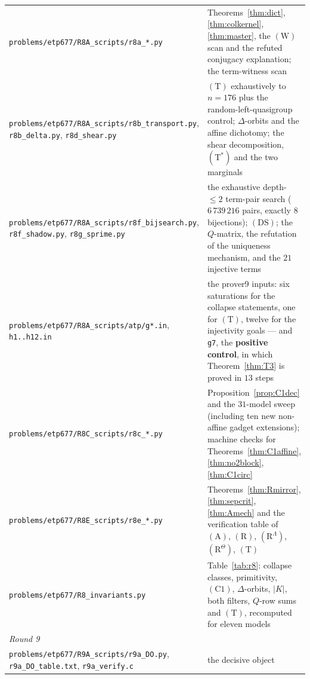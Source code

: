 \documentclass[11pt]{article}
\theoremstyle{plain}
\theoremstyle{definition}
\theoremstyle{remark}
\numberwithin{equation}{section}
\begin{document}
\begin{longtable}{p{}p{}}
\texttt{problems\slash etp677\slash R8A\_scripts\slash r8a\_*.py} &
Theorems~\ref{thm:dict}, \ref{thm:colkernel}, \ref{thm:master}, the $(\mathrm{W})$ scan and
the refuted conjugacy explanation; the term-witness scan\\
\texttt{problems\slash etp677\slash R8A\_scripts\slash r8b\_transport.py},\newline
\texttt{r8b\_delta.py}, \texttt{r8d\_shear.py} & $(\mathrm{T})$ exhaustively to $n=176$ plus
the random-left-quasigroup control; $\Delta$-orbits and the affine dichotomy; the shear
decomposition, $(\mathrm{T}^{*})$ and the two marginals\\
\texttt{problems\slash etp677\slash R8A\_scripts\slash r8f\_bijsearch.py},\newline
\texttt{r8f\_shadow.py}, \texttt{r8g\_sprime.py} & the exhaustive depth-$\le2$ term-pair
search ($6\,739\,216$ pairs, exactly $8$ bijections); $(\mathrm{DS})$; the $Q$-matrix, the
refutation of the uniqueness mechanism, and the $21$ injective terms\\
\texttt{problems\slash etp677\slash R8A\_scripts\slash atp\slash g*.in},\newline
\texttt{h1..h12.in} & the prover9 inputs: six saturations for the collapse statements, one
for $(\mathrm{T})$, twelve for the injectivity goals --- and \texttt{g7}, the \textbf{positive
control}, in which Theorem~\ref{thm:T3} is proved in $13$ steps\\
\texttt{problems\slash etp677\slash R8C\_scripts\slash r8c\_*.py} &
Proposition~\ref{prop:C1dec} and the $31$-model sweep (including ten new non-affine gadget
extensions); machine checks for Theorems~\ref{thm:C1affine}, \ref{thm:no2block},
\ref{thm:C1circ}\\
\texttt{problems\slash etp677\slash R8E\_scripts\slash r8e\_*.py} &
Theorems~\ref{thm:Rmirror}, \ref{thm:sepcrit}, \ref{thm:Amech} and the verification table of
$(\mathrm{A})$, $(\mathrm{R})$, $(\mathrm{R}^\Lambda)$, $(\mathrm{R}^\Theta)$, $(\mathrm{T})$\\
\texttt{problems\slash etp677\slash R8\_invariants.py} & Table~\ref{tab:r8}: collapse
classes, primitivity, $(\mathrm{C1})$, $\Delta$-orbits, $|K|$, both filters, $Q$-row sums and
$(\mathrm{T})$, recomputed for eleven models\\
\midrule
\multicolumn{2}{l}{\emph{Round 9}}\\
\midrule
\texttt{problems\slash etp677\slash R9A\_scripts\slash r9a\_DO.py},\newline
\texttt{r9a\_DO\_table.txt}, \texttt{r9a\_verify.c} & the decisive object

\end{longtable}
\end{document}
